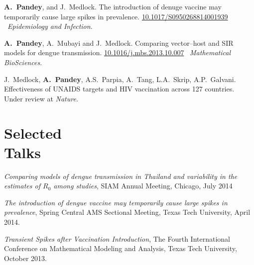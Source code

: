 \documentclass[margin,line,pifont,palatino,courier]{res}
\newcommand\doilink[1]{\href{http://dx.doi.org/#1}{#1}}
\begin{document}
\begin{resume}
\textbf{A.~Pandey}, and J.~Medlock. {The introduction of denuge vaccine
may temporarily cause large spikes in
prevalence}. \doilink{10.1017/S0950268814001939} ~\textit{Epidemiology and Infection}.


\textbf{A.~Pandey}, A.~Mubayi and J.~Medlock.  {Comparing
  vector--host and SIR models for dengue
  transmission}. \doilink{10.1016/j.mbs.2013.10.007}
~\textit{Mathematical BioSciences}.


J.~Medlock, \textbf{A.~Pandey}, A.S.~Parpia, A.~Tang, L.A.~Skrip,
A.P.~Galvani. {Effectiveness of UNAIDS targets and HIV vaccination
  across 127 countries}. Under review at \textit{Nature}.






\section{\sc Selected \\ Talks}

\emph{Comparing models of dengue transmission in Thailand and
  variability in the estimates of $R_0$ among studies}, SIAM Annual
Meeting, Chicago, July 2014


\emph{The introduction of dengue vaccine may temporarily cause large spikes in prevalence}, Spring Central AMS Sectional Meeting,
Texas Tech University, April 2014.




\emph{Transient Spikes after Vaccination Introduction}, The Fourth International Conference on Mathematical
Modeling and Analysis, Texas Tech University, October 2013.


\end{resume}
\end{document}
